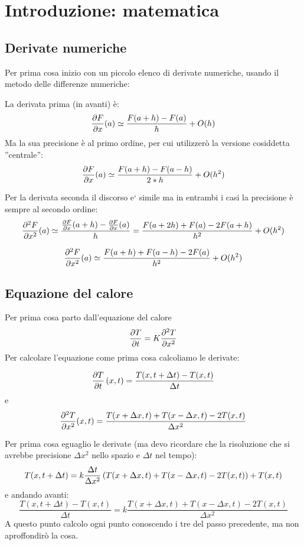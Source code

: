 \section{Introduzione: matematica}
\subsection{Derivate numeriche}
Per prima cosa inizio con un piccolo elenco di derivate numeriche, usando il metodo delle differenze numeriche:

La derivata prima (in avanti) \`e:
\begin{equation}
\frac{\partial F}{\partial x}(a) \simeq \frac{F(a+h)-F(a)}{h} + O(h)
\end{equation}
Ma la sua precisione \`e al primo ordine, per cui utilizzer\`o la versione cosiddetta ''centrale'':
\begin{equation}
\frac{\partial F}{\partial x}(a) \simeq \frac{F(a+h)-F(a-h)}{2*h} + O(h^2)
\end{equation}

Per la derivata seconda il discorso e` simile ma in entrambi i casi la precisione \`e sempre al secondo ordine:
\begin{equation}
\frac{\partial ^2F}{\partial x^2}(a) \simeq \frac{\frac{\partial F}{\partial x}(a+h)-\frac{\partial F}{\partial x}(a)}{h} = \frac{F(a+2h)+F(a)-2F(a+h)}{h^2} + O(h^2)
\end{equation}

\begin{equation}
\frac{\partial ^2F}{\partial x^2}(a) \simeq  \frac{F(a+h)+F(a-h)-2F(a)}{h^2} + O(h^2)
\end{equation}
\subsection{Equazione del calore}
Per prima cosa parto dall'equazione del calore
\begin{equation}\label{eq:calore}
\frac{\partial T}{\partial t} =K \frac{\partial ^2T}{\partial x^2}
\end{equation}
Per calcolare l'equazione come prima cosa calcoliamo le derivate:

\begin{equation}
\frac{\partial T}{\partial t}\left( x,t \right) = \frac{T(x,t+\Delta t)-T(x,t)}{\Delta t}
\end{equation}
e
\begin{equation}
\frac{\partial ^2T}{\partial x^2}(x,t) = \frac{T(x+\Delta x,t)+T(x-\Delta x,t)-2T(x,t)}{\Delta x^2}
\end{equation}

Per prima cosa eguaglio le derivate (ma devo ricordare che la risoluzione che si avrebbe precisione $\Delta x^2$ nello spazio e $\Delta t$ nel tempo):
\begin{equation}
T(x,t+\Delta t) = k\frac{\Delta t}{\Delta x^2} \left( T(x+\Delta x,t)+T(x-\Delta x,t)-2T(x,t) \right) + T(x,t)
\end{equation}
e andando avanti:
\begin{equation}
\frac{T(x,t+\Delta t)-T(x,t)}{\Delta t} = k \frac{T(x+\Delta x,t)+T(x-\Delta x,t)-2T(x,t)}{\Delta x^2}
\end{equation}
A questo punto calcolo ogni punto conoscendo i tre del passo precedente, ma non aproffondir\`o la cosa.

